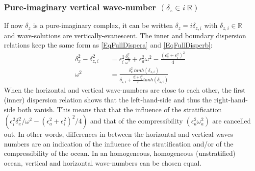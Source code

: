 \documentclass[a4paper,11pt]{article}
\begin{document}
\subsubsection{Pure-imaginary vertical wave-number $(\delta_z\in i\ 
\mathbb{R})$}
\label{subsubsectioniR}

If now $\delta_z$ is a pure-imaginary complex, it can be written $\delta_z=i\delta_{z,i}$ with $\delta_{z,i}\in\mathbb{R}$ and wave-solutions are vertically-evanescent. The inner and boundary dispersion relations keep the same form as \ref{EqFullDispera} and \ref{EqFullDisperb}:
\begin{subequations}
	\label{EqFullDisperi}
	\begin{alignat}{2}	
		\label{EqFullDisperai}
 		& \delta_x^2-\delta_{z,i}^2 &&=\epsilon_i^2\frac{\delta_x^2}
 			{\omega^2}+\epsilon_a^2\omega^2-\frac{(\epsilon_a^2+\epsilon_i^2)^2}{4}\\[3mm]
		\label{EqFullDisperbi}
		& \omega^2 &&=\frac{\delta_x^2\ tanh(\delta_{z,i})}
		{\delta_{z,i}+\frac{\epsilon_a^2+\epsilon_i^2}			{2}tanh(\delta_{z,i})}
	\end{alignat}
\end{subequations}
When the horizontal and vertical wave-numbers are close to each other, the first (inner) dispersion relation shows that the left-hand-side and thus the right-hand-side both vanish. This means that that the influence of the stratification $(\epsilon_i^2\delta_x^2/\omega^2-(\epsilon_a^2+\epsilon_i^2)^2/4)$ and that of the compressibility $(\epsilon_a^2\omega_a^2)$ are cancelled out. In other words, differences in between the horizontal and vertical waves-numbers are an indication of the influence of the stratification and/or of the compressibility of the ocean. In an homogeneous, homogeneous (unstratified) ocean, vertical and horizontal wave-numbers can be chosen equal.\\
\end{document}
